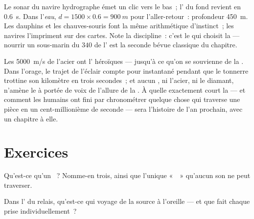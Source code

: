\begin{example}\label{ex:g7:sound-production:sonar}
Le sonar du navire hydrographe émet un clic vers le bas~; l' du
fond revient en \qty{0.6}{s}. Dans l'\emph{eau},
$d = 1500 \times 0.6 = \qty{900}{m}$ pour l'aller-retour~:
profondeur \qty{450}{m}. Les dauphins et les chauves-souris font la
même arithmétique d'instinct~; les navires l'impriment sur des
cartes. Note la discipline~: c'est le  qui choisit la
 --- nourrir un  sous-marin du $340$ de l' est la
seconde bévue classique du chapitre.
\end{example}

\begin{remark}\label{rem:g7:sound-production:light}
Les \qty{5000}{m/s} de l'acier ont l' héroïques --- jusqu'à ce
qu'on se souvienne de la . Dans l'orage, le trajet de l'éclair
compte pour instantané pendant que le tonnerre trottine son kilomètre
en trois secondes~; et aucun , ni l'acier, ni le diamant,
n'amène le  à portée de voix de l'allure de la . À quelle
 exactement court la  --- et comment les humains ont
fini par chronométrer quelque chose qui traverse une pièce en un
cent-millionième de seconde --- sera l'histoire de l'an prochain,
avec un chapitre à elle.
\end{remark}

\section{Exercices}

\begin{exercise}[$\star$]\label{exo:g7:sound-production:1}
Qu'est-ce qu'un ~? Nomme-en trois, ainsi que l'unique
«~~» qu'aucun son ne peut traverser.
\end{exercise}

\begin{exercise}[$\star$]\label{exo:g7:sound-production:2}
Dans l' du relais, qu'est-ce qui voyage de la source à
l'oreille --- et que fait chaque  prise individuellement~?
\end{exercise}

